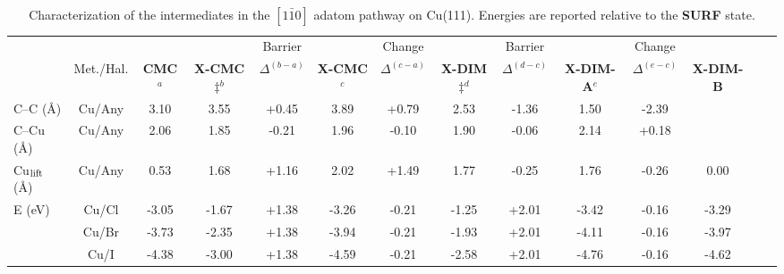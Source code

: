 \documentclass[journal=jpclcd,layout=traditional,manuscript=letter]{achemso} %
\begin{document}
\begin{table}
\centering
\scriptsize
\caption{Characterization of the intermediates in the $[1\bar{1}0]$ adatom pathway on Cu(111). Energies are reported relative to the \textbf{SURF} state.}
\label{table:adatom-110}
\begin{tabular}{ lccccccccccccc  }
 \hline
 \hline
 & & & & Barrier & & Change & & Barrier & &Change&\\
 & Met./Hal. & \textbf{CMC}$^{a}$ & \textbf{X-CMC$\ddagger$}$^{b}$ & $\Delta^{(b-a)}$ & \textbf{X-CMC}$^{c}$ &$\Delta^{(c-a)}$ & \textbf{X-DIM$\ddagger$}$^{d}$ & $\Delta^{(d-c)}$ & \textbf{X-DIM-A}$^{e}$ &$\Delta^{(e-c)}$ & \textbf{X-DIM-B}  \\ 
 \hline 
 {C--C (\si{\angstrom})} & Cu/Any & {3.10} & {3.55} & {+0.45} & {3.89} &{+0.79} & {2.53} &{-1.36} & {1.50} &{-2.39}\\ 
 \hline
 {C--Cu (\si{\angstrom}) } & Cu/Any & {2.06} & {1.85} & {-0.21} & {1.96} &{-0.10} & {1.90} &{-0.06} & {2.14} &{+0.18} &{} \\ 
 \hline
 {Cu$_{\rm lift}$ (\si{\angstrom}) } & Cu/Any & {0.53} & {1.68} & {+1.16} & {2.02} &{+1.49} & {1.77} & {-0.25} & {1.76} &{-0.26} &{0.00}\\ 
 \hline
 \multirow{3}{*}{E (\si{\electronvolt}) } & Cu/Cl & -3.05 &-1.67 & +1.38 &-3.26 &-0.21 & -1.25 & +2.01& -3.42&-0.16&-3.29 \\ 
 & Cu/Br &-3.73 &-2.35 &+1.38 & -3.94 &-0.21 & -1.93 & +2.01 & -4.11 & -0.16&-3.97 \\ 
 & Cu/I  & -4.38 & -3.00 & +1.38 & -4.59 &-0.21 & -2.58& +2.01 & -4.76 & -0.16&-4.62\\ 
 \hline
 \hline
\end{tabular}
\end{table}



\end{document}
